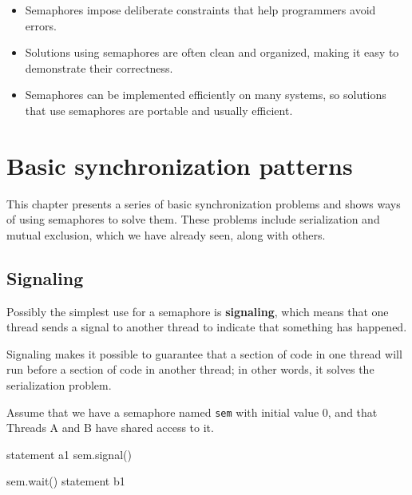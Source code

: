 \documentclass{book}
\begin{document}
\begin{itemize}

    \item Semaphores impose deliberate constraints that help
          programmers avoid errors.

    \item Solutions using semaphores are often clean and organized,
          making it easy to demonstrate their correctness.

    \item Semaphores can be implemented efficiently on many systems,
          so solutions that use semaphores are portable and usually
          efficient.

\end{itemize}


\chapter{Basic synchronization patterns}

This chapter presents a series of basic synchronization problems and
shows ways of using semaphores to solve them.  These problems include
serialization and mutual exclusion, which we have already seen, along
with others.

\section{Signaling}

Possibly the simplest use for a semaphore is {\bf signaling},
which means that one thread sends a signal to another
thread to indicate that something has happened.

Signaling makes it possible to guarantee
that a section of code in one thread will run before a section of
code in another thread; in other words, it solves the serialization
problem.

Assume that we have a semaphore named {\tt sem} with initial value
0, and that Threads A and B have shared access to it.

\noindent\begin{minipage}[t]{0.4\textwidth}
    \begin{unbreakable}[title={Thread A}]{}
statement a1
sem.signal()
\end{unbreakable}
\end{minipage}
\hfill
\noindent\begin{minipage}[t]{0.4\textwidth}
    \begin{unbreakable}[title={Thread B}]{}
sem.wait()
statement b1
\end{unbreakable}
\end{minipage}
\end{document}

